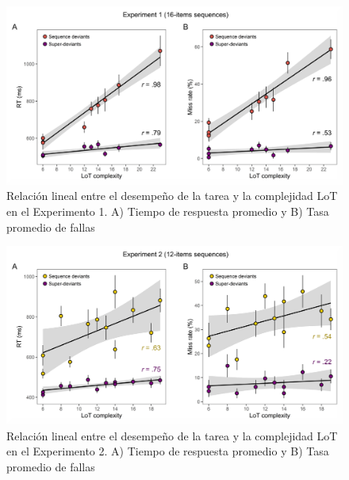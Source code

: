 \begin{figure}[t!]
      \includegraphics[scale=0.8]{figuras/plosbio/journal.pcbi.1008598.s001.png}
      \centering
      \caption{Relación lineal entre el desempeño de la tarea y la complejidad LoT en el Experimento 1. A) Tiempo de respuesta promedio y B) Tasa promedio de fallas}
      \label{PlosBIO-S1}
\end{figure}

\begin{figure}[t!]
      \includegraphics[scale=0.8]{figuras/plosbio/journal.pcbi.1008598.s002.png}
      \centering
      \caption{Relación lineal entre el desempeño de la tarea y la complejidad LoT en el Experimento 2. A) Tiempo de respuesta promedio y B) Tasa promedio de fallas}
      \label{PlosBIO-S2}
\end{figure}

